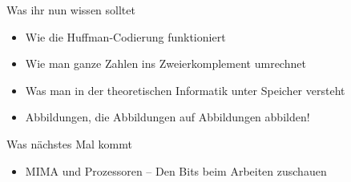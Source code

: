 








\begin{frame}	
	\begin{block}{Was ihr nun wissen solltet}
		\begin{itemize}
			\item Wie die Huffman-Codierung funktioniert
			\item Wie man ganze Zahlen ins Zweierkomplement umrechnet
			\item Was man in der theoretischen Informatik unter Speicher versteht
			\item Abbildungen, die Abbildungen auf Abbildungen abbilden!
		\end{itemize}
	\end{block}
	
	\begin{block}{Was nächstes Mal kommt}
		\begin{itemize}
			\item MIMA und Prozessoren – Den Bits beim Arbeiten zuschauen
		\end{itemize}
	\end{block}
\end{frame}

\slideThanks

